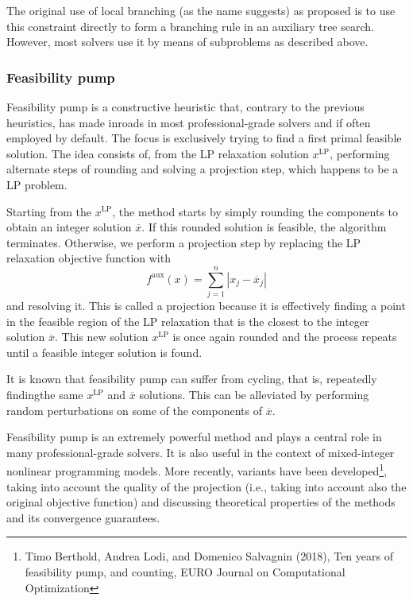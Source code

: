 The original use of local branching (as the name suggests) as proposed is to use this constraint directly to form a branching rule in an auxiliary tree search. However, most solvers use it by means of subproblems as  described above.  


  
\subsubsection{Feasibility pump}

Feasibility pump is a constructive heuristic that, contrary to the previous heuristics, has made inroads in most professional-grade solvers and if often employed by default. The focus is exclusively trying to find a first primal feasible solution. The idea consists of, from the LP relaxation solution $x^{\text{LP}}$, performing alternate steps of rounding and solving a projection step, which happens to be a LP problem.

Starting from the $x^{\text{LP}}$, the method starts by simply rounding the components to obtain an integer solution $\overline{x}$. If this rounded solution is feasible, the algorithm terminates. Otherwise, we perform a projection step by replacing the LP relaxation objective function with
	\begin{equation*}
		f^\text{aux}(x) = \sum_{j = 1}^n |x_j - \overline{x}_j|
	\end{equation*}
	and resolving it. This is called a projection because it is effectively finding a point in the feasible region of the LP relaxation that is the closest to the integer solution $\overline{x}$. This new solution $x^{\text{LP}}$ is once again rounded and the process repeats until a feasible integer solution is found.
	
It is known that feasibility pump can suffer from cycling, that is, repeatedly findingthe same $x^{\text{LP}}$ and $\overline{x}$ solutions. This can be alleviated by performing random perturbations on some of the components of $\overline{x}$.

Feasibility pump is an extremely powerful method and plays a central role in many professional-grade solvers. It is also useful in the context of mixed-integer nonlinear programming models. More recently, variants have been developed\footnote{Timo Berthold, Andrea Lodi, and Domenico Salvagnin (2018), Ten years of feasibility pump, and counting, EURO Journal on Computational Optimization}, taking into account the quality of the projection (i.e., taking into account also the original objective function) and discussing theoretical properties of the methods and its convergence guarantees. 


